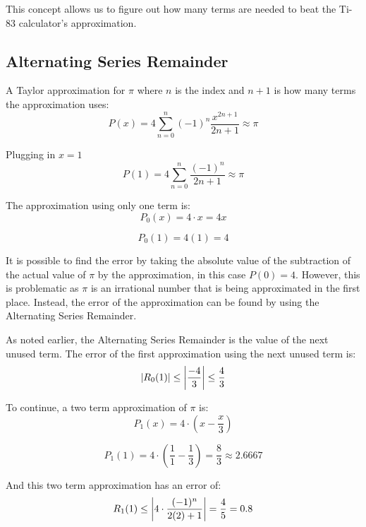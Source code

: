 \documentclass[12pt, titlepage]{article}
\begin{document}
This concept allows us to figure out how many terms are needed to beat the Ti-83 calculator's approximation.

\subsection{Alternating Series Remainder}
A Taylor approximation for \(\pi\) where \(n\) is the index and \(n + 1\) is how many terms the approximation uses:
\begin{equation*}
	P(x) = 4 \sum_{n=0}^{n} (-1)^{n} \frac{x^{2n+1}}{2n+1} \approx \pi
\end{equation*}

Plugging in \(x = 1\)
\begin{equation*}
	P(1) = 4\sum_{n=0}^{n}{ \frac{(-1)^n}{2n+1}} \approx \pi 
\end{equation*}

The approximation using only one term is:
\begin{equation*}
	P_{0}(x) = 4 \cdot x = 4x
\end{equation*}

\begin{equation*}
	P_{0}(1) = 4(1) = 4
\end{equation*}

It is possible to find the error by taking the absolute value of  the subtraction of the actual value of \(\pi\) by the approximation, in this case \(P(0) = 4\). However, this is problematic as \(\pi\) is an irrational number that is being approximated in the first place. Instead, the error of the approximation can be found by using the Alternating Series Remainder.

As noted earlier, the Alternating Series Remainder is the value of the next unused term. The error of the first approximation using the next unused term is:
\begin{equation*}
	\abs{R_{0}(1)} \leq \abs{\frac{-4}{3}} \leq \frac{4}{3}
\end{equation*}

To continue, a two term approximation of \(\pi\) is:
\begin{equation*}
	P_{1}(x) = 4 \cdot (x - \frac{x}{3}) 
\end{equation*}

\begin{equation*}
	P_{1}(1) = 4 \cdot (\frac{1}{1} - \frac{1}{3}) = \frac{8}{3} \approx 2.6667
\end{equation*}

And this two term approximation has an error of:
\begin{equation*}
	R_{1}(1) \leq  \abs{4 \cdot {\frac{(-1)^n}{2(2)+1}}} = \frac{4}{5} = 0.8
\end{equation*}
\end{document}
